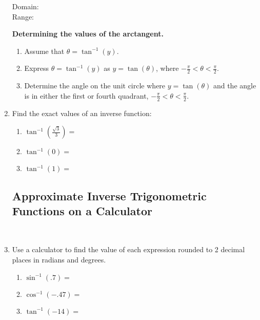 \begin{enumerate}
{{     }
 }

\noindent Domain:\\[10pt]
\noindent Range:\\

\clearpage


   \noindent\colorbox{blue!10}{%
   \parbox{\dimexpr\linewidth}%
   {%
     \textbf{Determining the values of the arctangent.}

     \begin{enumerate}
     \item Assume that $\theta = \tan^{-1}(y)$.
     \item Express $\theta = \tan^{-1}(y)$ as $y=\tan(\theta)$, where
       $-\frac{\pi}{2} < \theta < \frac{\pi}{2}$.
     \item Determine the angle on the unit circle where
       $y=\tan(\theta)$ and the angle is in either the first or fourth
       quadrant, $-\frac{\pi}{2} < \theta < \frac{\pi}{2}$.
     \end{enumerate}

   }
 }




\vspace{-.1in}
\item Find the exact values of an inverse function:
 \begin{enumerate}
\item $\displaystyle \tan^{-1}\left(\frac{\sqrt{3}}{3}\right)=$\\[.5in]

\item $\displaystyle \tan^{-1}(0)=$\\[.5in]

\item $\displaystyle \tan^{-1}(1)=$\\[.5in]

\end{enumerate}


\subsection{Approximate Inverse Trigonometric Functions on a Calculator} ~

\item Use a calculator to find the value of each expression rounded to 2 decimal places in radians and degrees.
\begin{enumerate}
\item $\sin^{-1}(.7)=$\\
\item $\cos^{-1}(-.47)=$\\
\item $\tan^{-1}(-14)=$\\
\end{enumerate}



\end{enumerate}
